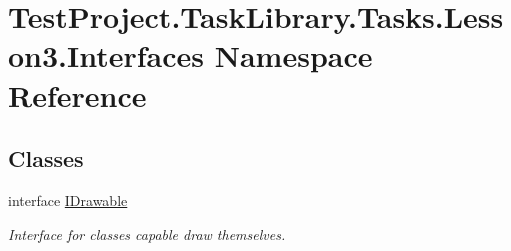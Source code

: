 \hypertarget{namespace_test_project_1_1_task_library_1_1_tasks_1_1_lesson3_1_1_interfaces}{}\section{Test\+Project.\+Task\+Library.\+Tasks.\+Lesson3.\+Interfaces Namespace Reference}
\label{namespace_test_project_1_1_task_library_1_1_tasks_1_1_lesson3_1_1_interfaces}
\subsection*{Classes}
\begin{DoxyCompactItemize}
\item 
interface \mbox{\hyperlink{interface_test_project_1_1_task_library_1_1_tasks_1_1_lesson3_1_1_interfaces_1_1_i_drawable}{I\+Drawable}}
\begin{DoxyCompactList}\small\item\em Interface for classes capable draw themselves. \end{DoxyCompactList}\end{DoxyCompactItemize}

